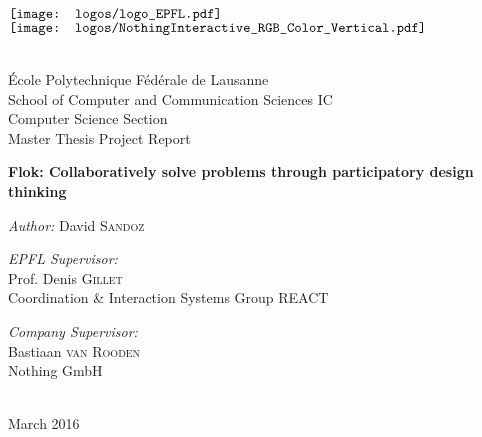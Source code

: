 
\begin{titlepage}

\begin{center}

\begin{minipage}{6in}
  \centering
  $\vcenter{\hbox{\texttt{[image: logos/logo\_EPFL.pdf]}}}$
  \hspace*{2cm}
  $\vcenter{\hbox{\texttt{[image: logos/NothingInteractive\_RGB\_Color\_Vertical.pdf]}}}$
\end{minipage}\\[2 cm]

{\Large École Polytechnique Fédérale de Lausanne}\\[0.5cm]
{\large School of Computer and Communication Sciences IC}\\[0.5cm]
{\large Computer Science Section}\\[0.5cm]
{\LARGE Master Thesis Project Report}\\[0.5cm]

\vspace{1cm}

{\huge \bfseries Flok: Collaboratively solve problems through participatory design thinking}\\[0.4cm]

\vspace{1.5cm}

\large \emph{Author:} David \textsc{Sandoz}\\[1.5cm]

\begin{minipage}{0.5\textwidth}
\begin{flushleft} \large
\emph{EPFL Supervisor:}\\
Prof. Denis \textsc{Gillet}\\
Coordination \& Interaction Systems Group REACT
\end{flushleft}
\end{minipage}
\begin{minipage}{0.4\textwidth}
\begin{flushright} \large
\emph{Company Supervisor:}\\
Bastiaan \textsc{van Rooden}\\
Nothing GmbH\\
~
\end{flushright}
\end{minipage}

\vfill

{\large March 2016}

\end{center}

\end{titlepage}

\pagecolor{white}
\color{black}
